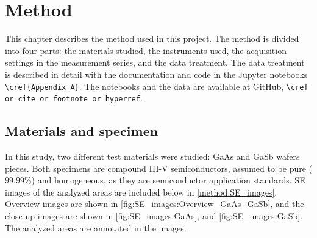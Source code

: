 \chapter{Method}
\label{ch:method}


This chapter describes the method used in this project.
The method is divided into four parts: the materials studied, the instruments used, the acquisition settings in the measurement series, and the data treatment.
The data treatment is described in detail with the documentation and code in the Jupyter notebooks \verb|\cref{Appendix A}|.
The notebooks and the data are available at GitHub, \verb|\cref or cite or footnote or hyperref|.










\section{Materials and specimen}
\label{method:materials}

In this study, two different test materials were studied: GaAs and GaSb wafers pieces.
Both specimens are compound III-V semiconductors, assumed to be pure ($99.99$\%) and homogeneous, as they are semiconductor application standards.
SE images of the analyzed areas are included below in \cref{method:SE_images}.
Overview images are shown in \cref{fig:SE_images:Overview_GaAs_GaSb}, and the close up images are shown in \cref{fig:SE_images:GaAs}, and \cref{fig:SE_images:GaSb}. %
The analyzed areas are annotated in the images.


